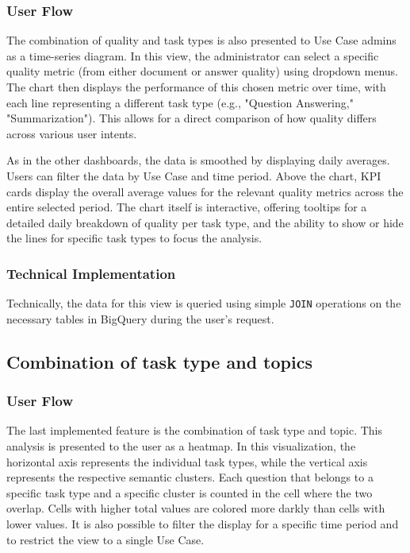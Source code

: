 \documentclass[
	english,
	ruledheaders=section,%
	class=report,%
	thesis={type=bachelor},%
	accentcolor=1b,%
	custommargins=true,%
	marginpar=false,%
	parskip=half-,%
	fontsize=11pt,%
	DIV=14,
]{tudapub}
\begin{document}
\subsubsection{User Flow}
The combination of quality and task types is also presented to Use Case admins as a time-series diagram. In this view, the administrator can select a specific quality metric (from either document or answer quality) using dropdown menus. The chart then displays the performance of this chosen metric over time, with each line representing a different task type (e.g., "Question Answering," "Summarization"). This allows for a direct comparison of how quality differs across various user intents.

As in the other dashboards, the data is smoothed by displaying daily averages. Users can filter the data by Use Case and time period. Above the chart, KPI cards display the overall average values for the relevant quality metrics across the entire selected period. The chart itself is interactive, offering tooltips for a detailed daily breakdown of quality per task type, and the ability to show or hide the lines for specific task types to focus the analysis.

\subsubsection{Technical Implementation}
Technically, the data for this view is queried using simple \texttt{JOIN} operations on the necessary tables in BigQuery during the user's request.
\subsection{Combination of task type and topics}
\subsubsection{User Flow}
The last implemented feature is the combination of task type and topic. This analysis is presented to the user as a heatmap. In this visualization, the horizontal axis represents the individual task types, while the vertical axis represents the respective semantic clusters. Each question that belongs to a specific task type and a specific cluster is counted in the cell where the two overlap. Cells with higher total values are colored more darkly than cells with lower values. It is also possible to filter the display for a specific time period and to restrict the view to a single Use Case.
\end{document}
